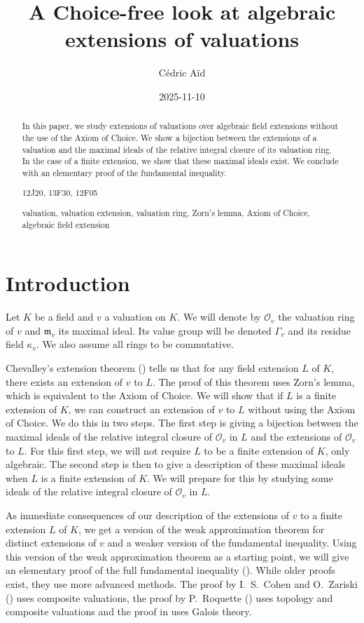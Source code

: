 \documentclass[12pt,a4paper]{amsart}
\title{A Choice-free look at algebraic extensions of valuations}
\author{C\'edric A\"id}
\date{2025-11-10}
\theoremstyle{definition}
\begin{document}
\begin{abstract}
In this paper, we study extensions of valuations over algebraic field extensions without the use of the Axiom of Choice.
We show a bijection between the extensions of a valuation and the maximal ideals of the relative integral closure of its valuation ring.
In the case of a finite extension, we show that these maximal ideals exist.
We conclude with an elementary proof of the fundamental inequality.
\smallskip

\noindent
{} 12J20, 13F30, 12F05
\medskip

\noindent
{} valuation, valuation extension, valuation ring, Zorn's lemma, Axiom of Choice, algebraic field extension
\end{abstract}
\maketitle
\section{Introduction}
Let $K$ be a field and $v$ a valuation on $K$.
We will denote by $\mathcal{O}_v$ the valuation ring of $v$ and $\mathfrak{m}_v$ its maximal ideal.
Its value group will be denoted $\Gamma_v$ and its residue field $\kappa_v$.
We also assume all rings to be commutative.

Chevalley's extension theorem (\cite[Theorem 3.1.1]{engler2005valued}) tells us that for any field extension $L$ of $K$, there exists an extension of $v$ to $L$.
The proof of this theorem uses Zorn's lemma, which is equivalent to the Axiom of Choice.
We will show that if $L$ is a finite extension of $K$, we can construct an extension of $v$ to $L$ without using the Axiom of Choice.
We do this in two steps. The first step is giving a bijection between the maximal ideals of the relative integral closure of $\mathcal{O}_v$ in $L$ and the extensions of $\mathcal{O}_v$ to $L$.
For this first step, we will not require $L$ to be a finite extension of $K$, only algebraic.
The second step is then to give a description of these maximal ideals when $L$ is a finite extension of $K$.
We will prepare for this by studying some ideals of the relative integral closure of $\mathcal{O}_v$ in $L$.

As immediate consequences of our description of the extensions of $v$ to a finite extension $L$ of $K$,
we get a version of the weak approximation theorem for distinct extensions of $v$ and a weaker version of the fundamental inequality.
Using this version of the weak approximation theorem as a starting point, we will give an elementary proof of the full fundamental inequality ().
While older proofs exist, they use more advanced methods.
The proof by I.~S.~Cohen and O.~Zariski (\cite{Zariski1957}) uses composite valuations, the proof by P.\ Roquette (\cite{Roquette1958}) uses topology and composite valuations
and the proof in \cite{engler2005valued} uses Galois theory.
\end{document}
